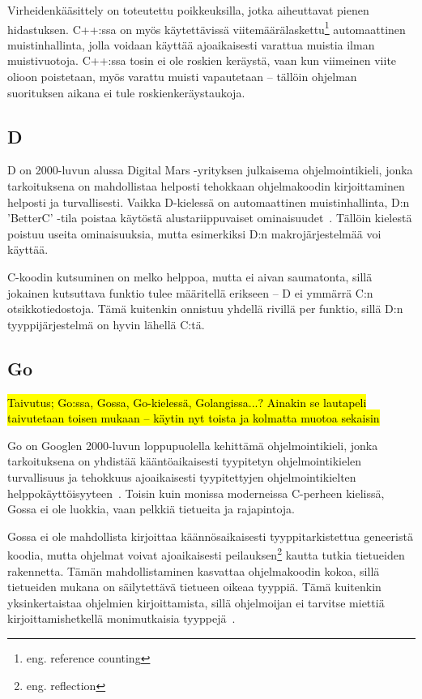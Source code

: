 Virheidenkääsittely on toteutettu poikkeuksilla, jotka aiheuttavat pienen
hidastuksen. C++:ssa on myös käytettävissä viitemäärälaskettu\footnote{eng.
reference counting} automaattinen muistinhallinta, jolla voidaan käyttää
ajoaikaisesti varattua muistia ilman muistivuotoja. C++:ssa tosin ei ole
roskien keräystä, vaan kun viimeinen viite olioon poistetaan, myös varattu
muisti vapautetaan -- tällöin ohjelman suorituksen aikana ei tule
roskienkeräystaukoja.

\subsection{D}

D on 2000-luvun alussa Digital Mars -yrityksen julkaisema ohjelmointikieli,
jonka tarkoituksena on mahdollistaa helposti tehokkaan ohjelmakoodin
kirjoittaminen helposti ja turvallisesti\citep{dhistory}. Vaikka D-kielessä on
automaattinen muistinhallinta, D:n 'BetterC' -tila poistaa käytöstä
alustariippuvaiset ominaisuudet~\citep{dbetterc}. Tällöin kielestä poistuu
useita ominaisuuksia, mutta esimerkiksi D:n makrojärjestelmää voi käyttää.

C-koodin kutsuminen on melko helppoa, mutta ei aivan saumatonta, sillä jokainen
kutsuttava funktio tulee määritellä erikseen -- D ei ymmärrä C:n
otsikkotiedostoja. Tämä kuitenkin onnistuu yhdellä rivillä per funktio, sillä
D:n tyyppijärjestelmä on hyvin lähellä C:tä.

\subsection{Go}

\hl{Taivutus; Go:ssa, Gossa, Go-kielessä, Golangissa...? Ainakin se lautapeli
taivutetaan toisen mukaan -- käytin nyt toista ja kolmatta muotoa sekaisin}

Go on Googlen 2000-luvun loppupuolella kehittämä ohjelmointikieli, jonka
tarkoituksena on yhdistää kääntöaikaisesti tyypitetyn ohjelmointikielen
turvallisuus ja tehokkuus ajoaikaisesti tyypitettyjen ohjelmointikielten
helppokäyttöisyyteen~\citep{gohistory}. Toisin kuin monissa moderneissa
C-perheen kielissä, Gossa ei ole luokkia, vaan pelkkiä tietueita ja
rajapintoja.

Gossa ei ole mahdollista kirjoittaa käännösaikaisesti tyyppitarkistettua
geneeristä koodia, mutta ohjelmat voivat ajoaikaisesti peilauksen\footnote{eng.
reflection} kautta tutkia tietueiden rakennetta. Tämän mahdollistaminen
kasvattaa ohjelmakoodin kokoa, sillä tietueiden mukana on säilytettävä tietueen
oikeaa tyyppiä. Tämä kuitenkin yksinkertaistaa ohjelmien kirjoittamista, sillä
ohjelmoijan ei tarvitse miettiä kirjoittamishetkellä monimutkaisia
tyyppejä~\citep[esim.][kalvo 8]{gohistory}.

